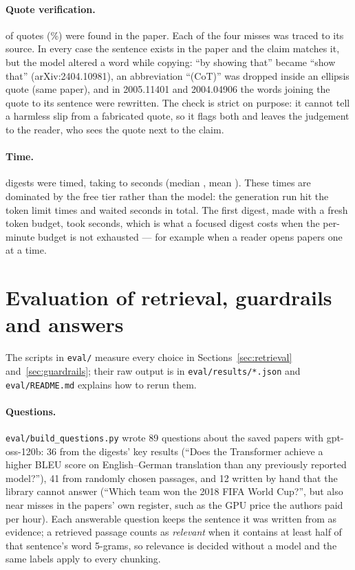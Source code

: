 \documentclass[11pt,a4paper]{article}
\newcommand{\code}[1]{\texttt{#1}}
\begin{document}
\paragraph{Quote verification.} \mQuotesVerified{} of \mQuotes{} quotes (\mQuotesPct\%) were found in the
paper. Each of the four misses was traced to its source. In every case the sentence exists in the paper and
the claim matches it, but the model altered a word while copying: ``by showing that'' became ``show that''
(arXiv:2404.10981), an abbreviation ``(CoT)'' was dropped inside an ellipsis quote (same paper), and in
2005.11401 and 2004.04906 the words joining the quote to its sentence were rewritten. The check is strict on
purpose: it cannot tell a harmless slip from a fabricated quote, so it flags both and leaves the judgement
to the reader, who sees the quote next to the claim.

\paragraph{Time.} \mTimed{} digests were timed, taking \mTimeMin{} to \mTimeMax{} seconds (median
\mTimeMedian, mean \mTimeMean). These times are dominated by the free tier rather than the model: the
generation run hit the token limit \mWaits{} times and waited \mWaitSeconds{} seconds in total. The first
digest, made with a fresh token budget, took \mTimeMin{} seconds, which is what a focused digest costs when
the per-minute budget is not exhausted --- for example when a reader opens papers one at a time.

\section{Evaluation of retrieval, guardrails and answers}\label{sec:eval}

The scripts in \code{eval/} measure every choice in Sections~\ref{sec:retrieval} and~\ref{sec:guardrails};
their raw output is in \code{eval/results/*.json} and \code{eval/README.md} explains how to rerun them.

\paragraph{Questions.} \code{eval/build\_questions.py} wrote 89 questions about the saved papers with
gpt-oss-120b: 36 from the digests' key results (``Does the Transformer achieve a higher BLEU score on
English--German translation than any previously reported model?''), 41 from randomly
chosen passages, and 12 written by hand that the library cannot answer (``Which team won the 2018 FIFA
World Cup?'', but also near misses in the papers' own register, such as the GPU price the authors paid per
hour). Each answerable question
keeps the sentence it was written from as evidence; a retrieved passage counts as \emph{relevant} when it
contains at least half of that sentence's word 5-grams, so relevance is decided without a model and the
same labels apply to every chunking.
\end{document}
